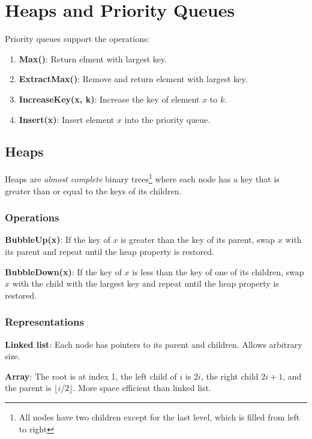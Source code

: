 \section{Heaps and Priority Queues}

Priority queues support the operations:
\begin{enumerate}
    \setlength{\itemsep}{0em}
    \item \textbf{Max()}: Return elment with largest key.
    \item \textbf{ExtractMax()}: Remove and return element with largest key.
    \item \textbf{IncreaseKey(x, k)}: Increase the key of element $x$ to $k$.
    \item \textbf{Insert(x)}: Insert element $x$ into the priority queue.
\end{enumerate}

\subsection{Heaps}
Heaps are \emph{almost complete} binary trees\footnote{All nodes have two children except for the last level, which is filled from left to right}
where each node has a key that is greater than or equal to the keys of its children.

\subsubsection{Operations}
\textbf{BubbleUp(x)}: If the key of $x$ is greater than the key of its parent, swap $x$ with its parent and repeat until the heap property is restored.

\textbf{BubbleDown(x)}: If the key of $x$ is less than the key of one of its children, swap $x$ with the child with the largest key and repeat until the heap property is restored.


\subsubsection{Representations}

\textbf{Linked list}:
Each node has pointers to its parent and children.
Allows arbitrary size. 

\textbf{Array}:
The root is at index 1, the left child of $i$ is $2i$, the right child $2i + 1$, and the parent is $\lfloor i / 2 \rfloor$.
More space efficient than linked list.

